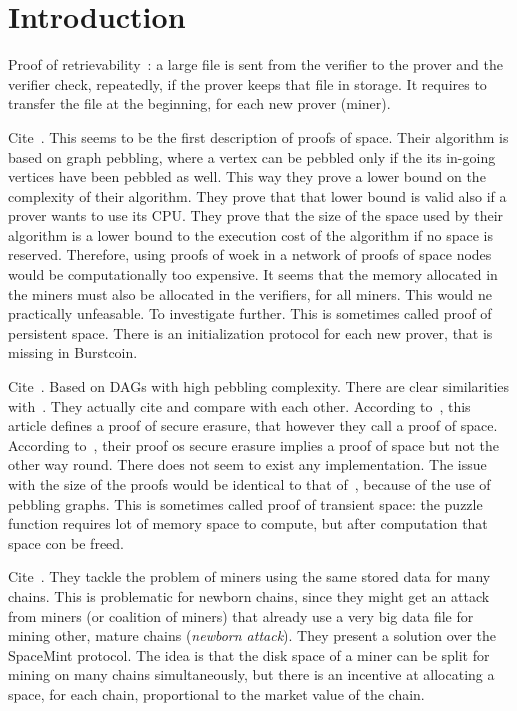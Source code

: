 \section{Introduction}\label{sec:introduction}

Proof of retrievability~\cite{JuelsK07}: a large file
is sent from the verifier to the prover and the verifier
check, repeatedly, if the prover keeps that file in storage. It requires to transfer the file
at the beginning, for each new prover (miner).

Cite~\cite{DziembowskiFKP15}. This seems to be the first description of proofs of space.
Their algorithm is based on graph pebbling, where a vertex can be pebbled only if the
its in-going vertices have been pebbled as well. This way they prove a lower bound on the
complexity of their algorithm. They prove that that lower bound is valid also if a prover
wants to use its CPU. They prove that the size of the space used by their algorithm
is a lower bound to the execution cost of the algorithm if no space is reserved.
Therefore, using proofs of woek in a network of proofs of space nodes would
be computationally too expensive. It seems that the memory allocated in the miners
must also be allocated in the verifiers, for all miners. This would ne practically unfeasable.
To investigate further.
This is sometimes called proof of persistent space.
There is an initialization protocol for each new prover, that is missing in Burstcoin.

Cite~\cite{AtenieseBFG14}. Based on DAGs with high pebbling complexity. There are clear similarities
with~\cite{DziembowskiFKP15}. They actually cite and compare with each other.
According to~\cite{DziembowskiFKP15}, this article defines a proof of secure erasure,
that however they call a proof of space. According to~\cite{DziembowskiFKP15},
their proof os secure erasure
implies a proof of space but not the other way round. There does not seem to exist
any implementation. The issue with the size of the proofs would be identical to that
of~\cite{DziembowskiFKP15}, because of the use of pebbling graphs.
This is sometimes called proof of transient space: the puzzle function requires lot of
memory space to compute, but after computation that space con be freed.

Cite~\cite{TangZDWLG0L19}. They tackle the problem of miners using the same stored data
for many chains. This is problematic for newborn chains, since they might get an attack
from miners (or coalition of miners) that already use a very big data file for mining other,
mature chains (\emph{newborn attack}). They present a solution over the SpaceMint protocol.
The idea is that the disk space of a miner can be split for mining on many chains
simultaneously, but there is an incentive at allocating a space, for each chain, proportional
to the market value of the chain.

